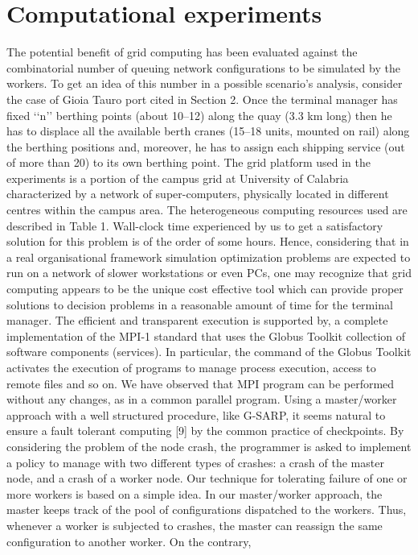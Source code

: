 %

\section{ Computational experiments}
\label{3:sec:4}



The potential benefit of grid computing has been evaluated against the combinatorial number of queuing
network configurations to be simulated by the workers. To get an idea of this number in a possible scenario’s
analysis, consider the case of Gioia Tauro port cited in Section 2. Once the terminal manager has fixed ‘‘n’’
berthing points (about 10–12) along the quay (3.3 km long) then he has to displace all the available berth
cranes (15–18 units, mounted on rail) along the berthing positions and, moreover, he has to assign each shipping
service (out of more than 20) to its own berthing point.
The grid platform used in the experiments is a portion of the campus grid at University of Calabria characterized
by a network of super-computers, physically located in different centres within the campus area. The
heterogeneous computing resources used are described in Table 1.
Wall-clock time experienced by us to get a satisfactory solution for this problem is of the order of some
hours. Hence, considering that in a real organisational framework simulation optimization problems are
expected to run on a network of slower workstations or even PCs, one may recognize that grid computing
appears to be the unique cost effective tool which can provide proper solutions to decision problems in a reasonable
amount of time for the terminal manager.
The efficient and transparent execution  is supported by, a complete implementation
of the MPI-1 standard that uses the Globus Toolkit collection of software components (services). In particular,
the  command of the Globus Toolkit activates the execution of  programs to
manage process execution, access to remote files and so on. We have observed that MPI program can be performed
without any changes, as in a common parallel program.
Using a master/worker approach with a well structured procedure, like G-SARP, it seems natural to ensure
a fault tolerant computing [9] by the common practice of checkpoints. By considering the problem of the node
crash, the programmer is asked to implement a policy to manage with two different types of crashes: a crash of
the master node, and a crash of a worker node. Our technique for tolerating failure of one or more workers is
based on a simple idea. In our master/worker approach, the master keeps track of the pool of configurations
dispatched to the workers. Thus, whenever a worker is subjected to crashes, the master can reassign the same
configuration to another worker. On the contrary,